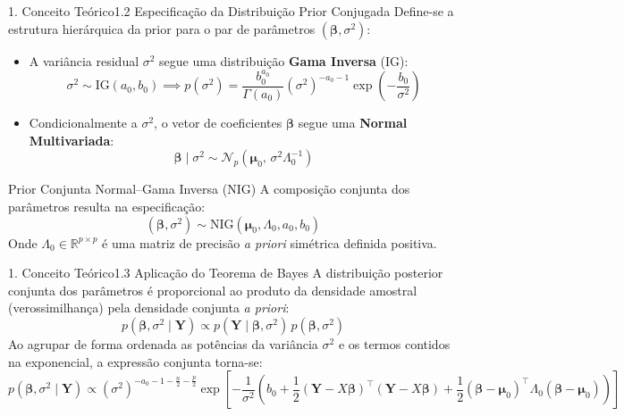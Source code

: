 \documentclass[10pt,aspectratio=169]{beamer}
\begin{document}
\begin{frame}{1. Conceito Teórico}{1.2 Especificação da Distribuição Prior Conjugada}
    Define-se a estrutura hierárquica da prior para o par de parâmetros $(\boldsymbol{\beta}, \sigma^2)$:
    \begin{itemize}
        \item A variância residual $\sigma^2$ segue uma distribuição \textbf{Gama Inversa} ($\text{IG}$):
        $$\sigma^2 \sim \text{IG}(a_0, b_0) \implies p(\sigma^2) = \frac{b_0^{a_0}}{\Gamma(a_0)}(\sigma^2)^{-a_0-1} \exp\left(-\frac{b_0}{\sigma^2}\right)$$
        \item Condicionalmente a $\sigma^2$, o vetor de coeficientes $\boldsymbol{\beta}$ segue uma \textbf{Normal Multivariada}:
        $$\boldsymbol{\beta} \mid \sigma^2 \sim \mathcal{N}_p\left(\boldsymbol{\mu}_0,\, \sigma^2 \Lambda_0^{-1}\right)$$
    \end{itemize}
    \begin{block}{Prior Conjunta Normal--Gama Inversa (NIG)}
        A composição conjunta dos parâmetros resulta na especificação:
        $$(\boldsymbol{\beta}, \sigma^2) \sim \text{NIG}(\boldsymbol{\mu}_0, \Lambda_0, a_0, b_0)$$
        Onde $\Lambda_0 \in \mathbb{R}^{p \times p}$ é uma matriz de precisão \textit{a priori} simétrica definida positiva.
    \end{block}
\end{frame}

\begin{frame}{1. Conceito Teórico}{1.3 Aplicação do Teorema de Bayes}
    A distribuição posterior conjunta dos parâmetros é proporcional ao produto da densidade amostral (verossimilhança) pela densidade conjunta \textit{a priori}:
    $$p(\boldsymbol{\beta}, \sigma^2 \mid \mathbf{Y}) \propto p(\mathbf{Y} \mid \boldsymbol{\beta}, \sigma^2)\, p(\boldsymbol{\beta}, \sigma^2)$$
    \vspace{0.1cm}
    Ao agrupar de forma ordenada as potências da variância $\sigma^2$ e os termos contidos na exponencial, a expressão conjunta torna-se:
    {\small
    $$p(\boldsymbol{\beta}, \sigma^2 \mid \mathbf{Y}) \propto (\sigma^2)^{-a_0 - 1 - \frac{n}{2} - \frac{p}{2}} \exp\left[ -\frac{1}{\sigma^2}\left(b_0 + \frac{1}{2}(\mathbf{Y} - X\boldsymbol{\beta})^\top(\mathbf{Y} - X\boldsymbol{\beta}) + \frac{1}{2}(\boldsymbol{\beta} - \boldsymbol{\mu}_0)^\top \Lambda_0 (\boldsymbol{\beta} - \boldsymbol{\mu}_0)\right) \right]$$}
\end{frame}
\end{document}
